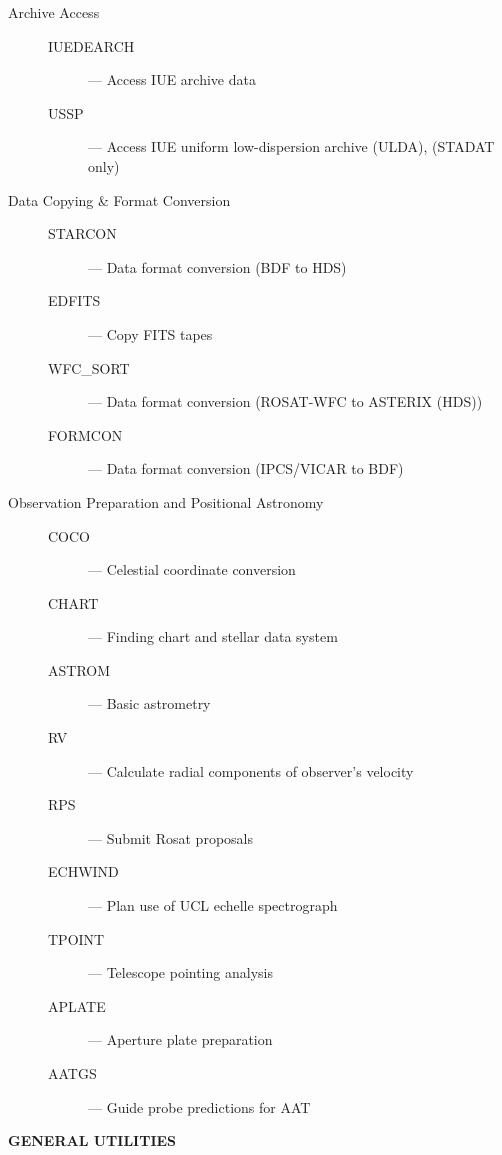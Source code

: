 \vspace{10mm}

\begin{description}

\item [Archive Access] \mbox{}
\begin{description}
\item [IUEDEARCH] --- Access IUE archive data
\item [USSP] --- Access IUE uniform low-dispersion archive (ULDA), (STADAT only)
\end{description}

\item [Data Copying \& Format Conversion] \mbox{}
\begin{description}
\item [STARCON] --- Data format conversion (BDF to HDS)
\item [EDFITS] --- Copy FITS tapes
\item [WFC\_SORT] --- Data format conversion (ROSAT-WFC to ASTERIX (HDS))
\item [FORMCON] --- Data format conversion (IPCS/VICAR to BDF)
\end{description}

\item [Observation Preparation and Positional Astronomy] \mbox{}
\begin{description}
\item [COCO] --- Celestial coordinate conversion
\item [CHART] --- Finding chart and stellar data system
\item [ASTROM] --- Basic astrometry
\item [RV] --- Calculate radial components of observer's velocity
\item [RPS] --- Submit Rosat proposals
\item [ECHWIND] --- Plan use of UCL echelle spectrograph
\item [TPOINT] --- Telescope pointing analysis
\item [APLATE] --- Aperture plate preparation
\item [AATGS] --- Guide probe predictions for AAT
\end{description}

\end{description}

\newpage

\begin{center}
{\bf\Large GENERAL UTILITIES}
\end{center}

